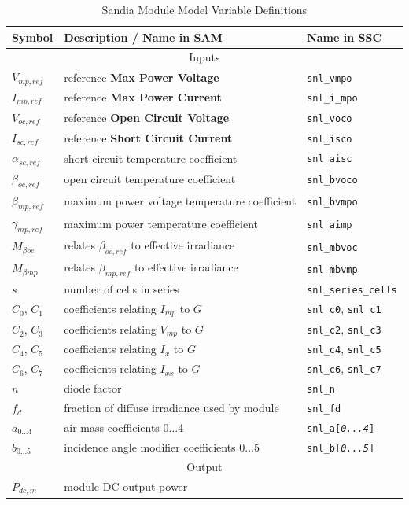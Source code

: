 \documentclass[12pt,letterpaper]{article}
\begin{document}
\begin{table}
\begin{center}
\caption{Sandia Module Model Variable Definitions}
\begin{tabular}{lll}
\midrule
Symbol & Description / \textbf{Name in SAM} & Name in SSC \\
\midrule
\multicolumn{3}{c}{Inputs}\\
$V_{mp,ref}$ & reference \textbf{Max Power Voltage} &\texttt{snl\_vmpo} \\
$I_{mp,ref}$ & reference \textbf{Max Power Current} & \texttt{snl\_i\_mpo} \\
$V_{oc,ref}$ & reference \textbf{Open Circuit Voltage} & \texttt{snl\_voco} \\
$I_{sc,ref}$ & reference \textbf{Short Circuit Current} & \texttt{snl\_isco} \\
$\alpha_{sc,ref}$ & short circuit temperature coefficient & \texttt{snl\_aisc} \\
$\beta_{oc,ref}$ & open circuit temperature coefficient & \texttt{snl\_bvoco} \\
$\beta_{mp,ref}$ & maximum power voltage temperature coefficient & \texttt{snl\_bvmpo} \\
$\gamma_{mp,ref}$ & maximum power temperature coefficient & \texttt{snl\_aimp} \\
$M_{\beta oc}$ & relates $\beta_{oc,ref}$ to effective irradiance& \texttt{snl\_mbvoc} \\
$M_{\beta mp}$ & relates $\beta_{mp,ref}$ to effective irradiance& \texttt{snl\_mbvmp} \\
$s$ & number of cells in series & \texttt{snl\_series\_cells} \\
$C_0$, $C_1$ & coefficients relating $I_{mp}$ to $G$ & \texttt{snl\_c0}, \texttt{snl\_c1} \\
$C_2$, $C_3$ & coefficients relating $V_{mp}$ to $G$ & \texttt{snl\_c2}, \texttt{snl\_c3} \\
$C_4$, $C_5$ & coefficients relating $I_x$ to $G$ & \texttt{snl\_c4}, \texttt{snl\_c5} \\
$C_6$, $C_7$ & coefficients relating $I_{xx}$ to $G$ & \texttt{snl\_c6}, \texttt{snl\_c7} \\
$n$ & diode factor & \texttt{snl\_n} \\
$f_d$ & fraction of diffuse irradiance used by module & \texttt{snl\_fd} \\
$a_{0...4}$ & air mass coefficients 0...4 & \texttt{snl\_a[\textit{0...4}]} \\
$b_{0...5}$ & incidence angle modifier coefficients 0...5 & \texttt{snl\_b[\textit{0...5}]} 
\\
\midrule
\multicolumn{3}{c}{Output}\\
$P_{dc,m}$ & module DC output power & \\
\hline
\end{tabular}
\label{tab-sandiamodulevars}
\end{center}
\end{table}
\end{document}
